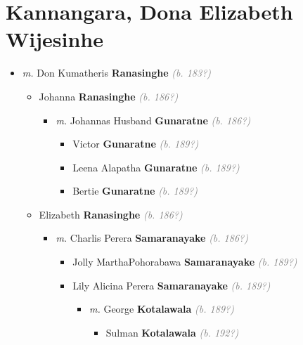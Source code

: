 \documentclass[10pt, openany]{book}
\begin{document}
\chapter{Kannangara, Dona Elizabeth Wijesinhe}
\label{00000415}
\textcolor{slmaroon}{\textit{}}
\begin{itemize}
\item{\textit{m.} Don Kumatheris \textbf{Ranasinghe} \textcolor{gray}{\textit{(b. 183?)}}   \label{couple:00000415:00000625} \begin{itemize}
\item{Johanna \textbf{Ranasinghe} \textcolor{gray}{\textit{(b. 186?)}}
\begin{itemize}
\item{\textit{m.} Johannas Husband \textbf{Gunaratne} \textcolor{gray}{\textit{(b. 186?)}}   \label{couple:00000206:00000629} \begin{itemize}
\item{Victor \textbf{Gunaratne} \textcolor{gray}{\textit{(b. 189?)}}
 }
\item{Leena Alapatha \textbf{Gunaratne} \textcolor{gray}{\textit{(b. 189?)}}
  }
\item{Bertie \textbf{Gunaratne} \textcolor{gray}{\textit{(b. 189?)}}
 }
\end{itemize}}
\end{itemize}
 }
\item{Elizabeth \textbf{Ranasinghe} \textcolor{gray}{\textit{(b. 186?)}}
\begin{itemize}
\item{\textit{m.} Charlis Perera \textbf{Samaranayake} \textcolor{gray}{\textit{(b. 186?)}}   \label{couple:00000626:00000680} \begin{itemize}
\item{Jolly MarthaPohorabawa \textbf{Samaranayake} \textcolor{gray}{\textit{(b. 189?)}}
  }
\item{Lily Alicina Perera \textbf{Samaranayake} \textcolor{gray}{\textit{(b. 189?)}}
\begin{itemize}
\item{\textit{m.} George \textbf{Kotalawala} \textcolor{gray}{\textit{(b. 189?)}}   \label{couple:00000481:00000683} \begin{itemize}
\item{Sulman \textbf{Kotalawala} \textcolor{gray}{\textit{(b. 192?)}}
}
\end{itemize}}
\end{itemize}}
\end{itemize}}
\end{itemize}}
\end{itemize}}
\end{itemize}
\end{document}
